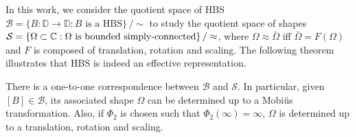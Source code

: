 \documentclass[review,onefignum,onetabnum]{siamonline190516}
\begin{document}
In this work, we consider the quotient space of HBS $\mathcal{B} = \{B:\mathbb{D}\to \mathbb{D}:B \text{ is a HBS} \} \,/ \sim$ to study the quotient space of shapes $\mathcal{S} = \{\Omega \subset \mathbb{C} : \Omega \text{ is bounded simply-connected}\} \, / \approx$, where $\Omega \approx \bar{\Omega}$ iff $\bar{\Omega} = F(\Omega)$ and $F$ is composed of translation, rotation and scaling. The following theorem illustrates that HBS is indeed an effective representation.

\begin{theorem}\label{one to one equivalence class}
There is a one-to-one correspondence between $\mathcal{B}$ and $\mathcal{S}$. In particular, given $[B]\in \mathcal{B}$, its associated shape $\Omega$ can be determined up to a Mobi\"us transformation. Also, if $\Phi_2$ is chosen such that $\Phi_2(\infty) = \infty$, $\Omega$ is determined up to a translation, rotation and scaling.
\end{theorem}
\end{document}
